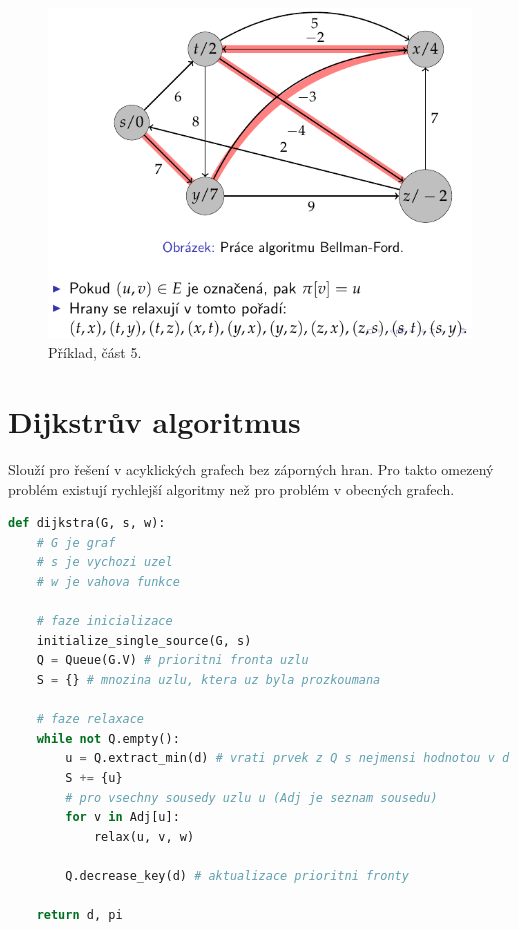 \begin{figure}[H]
    \centering
    \includegraphics[width=0.75\linewidth]{example_bellman_ford_p5.pdf}
    \caption{Příklad, část 5.}
\end{figure}


\section{Dijkstrův algoritmus}

Slouží pro řešení v acyklických grafech bez záporných hran. Pro takto omezený problém existují rychlejší algoritmy než pro problém v obecných grafech.

\bigskip\noindent\begin{minipage}{\linewidth}
\begin{lstlisting}[language=Python, caption={Algoritmus Dijkstra.}]
def dijkstra(G, s, w):
    # G je graf
    # s je vychozi uzel
    # w je vahova funkce

    # faze inicializace
    initialize_single_source(G, s)
    Q = Queue(G.V) # prioritni fronta uzlu
    S = {} # mnozina uzlu, ktera uz byla prozkoumana

    # faze relaxace
    while not Q.empty():
        u = Q.extract_min(d) # vrati prvek z Q s nejmensi hodnotou v d
        S += {u}
        # pro vsechny sousedy uzlu u (Adj je seznam sousedu)
        for v in Adj[u]:
            relax(u, v, w)

        Q.decrease_key(d) # aktualizace prioritni fronty

    return d, pi
\end{lstlisting}
\end{minipage}

